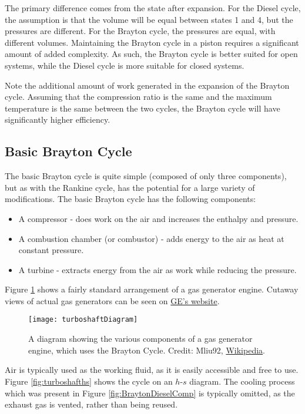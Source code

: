 The primary difference comes from the state after expansion.  For the Diesel cycle, the assumption is that the volume will be equal between states 1 and 4, but the pressures are different.  For the Brayton cycle, the pressures are equal, with different volumes.  Maintaining the Brayton cycle in a piston requires a significant amount of added complexity.  As such, the Brayton cycle is better suited for open systems, while the Diesel cycle is more suitable for closed systems.

Note the additional amount of work generated in the expansion of the Brayton cycle.  Assuming that the compression ratio is the same and the maximum temperature is the same between the two cycles, the Brayton cycle will have significantly higher efficiency.

\subsection{Basic Brayton Cycle}
The basic Brayton cycle is quite simple (composed of only three components), but as with the Rankine cycle, has the potential for a large variety of modifications.
The basic Brayton cycle has the following components:

\begin{itemize}
\item A compressor - does work on the air and increases the enthalpy and pressure.
\item A combustion chamber (or combustor) - adds energy to the air as heat at constant pressure.
\item A turbine - extracts energy from the air as work while reducing the pressure.
\end{itemize}

Figure \ref{fig:turboshaft} shows a fairly standard arrangement of a gas generator engine.  Cutaway views of actual gas generators can be seen on \href{https://www.ge.com/gas-power/products/gas-turbines}{GE's website}.
\begin{figure}[H]
  \centering
  \texttt{[image: turboshaftDiagram]}
  \caption{A diagram showing the various components of a gas generator engine, which uses the Brayton Cycle. Credit: Mliu92, \href{https://commons.wikimedia.org/wiki/File:Turboshaft_operation_(multilanguage).svg}{Wikipedia}.}
  \label{fig:turboshaft}
\end{figure}

Air is typically used as the working fluid, as it is easily accessible and free to use.  Figure \ref{fig:turboshafths} shows the cycle on an $h$-$s$ diagram.  The cooling process which was present in Figure \ref{fig:BraytonDieselComp} is typically omitted, as the exhaust gas is vented, rather than being reused.

